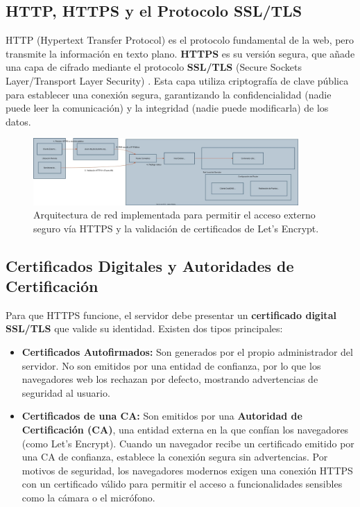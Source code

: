 \subsection{HTTP, HTTPS y el Protocolo SSL/TLS}
HTTP (Hypertext Transfer Protocol) es el protocolo fundamental de la web, pero transmite la información en texto plano. \textbf{HTTPS} es su versión segura, que añade una capa de cifrado mediante el protocolo \textbf{SSL/TLS} (Secure Sockets Layer/Transport Layer Security) \cite{rescorla2001ssl}. Esta capa utiliza criptografía de clave pública para establecer una conexión segura, garantizando la confidencialidad (nadie puede leer la comunicación) y la integridad (nadie puede modificarla) de los datos.

\begin{figure}[H]
    \centering
    \includegraphics[width=0.9\textwidth]{img/ArquitecturadeRedparaelDesplieguedeJitsi.jpg}
    \caption{Arquitectura de red implementada para permitir el acceso externo seguro vía HTTPS y la validación de certificados de Let's Encrypt.}
    \label{fig:arquitectura_red_letsencrypt}
\end{figure}

\subsection{Certificados Digitales y Autoridades de Certificación}
Para que HTTPS funcione, el servidor debe presentar un \textbf{certificado digital SSL/TLS} que valide su identidad. Existen dos tipos principales:
\begin{itemize}
    \item \textbf{Certificados Autofirmados:} Son generados por el propio administrador del servidor. No son emitidos por una entidad de confianza, por lo que los navegadores web los rechazan por defecto, mostrando advertencias de seguridad al usuario.
    \item \textbf{Certificados de una CA:} Son emitidos por una \textbf{Autoridad de Certificación (CA)}, una entidad externa en la que confían los navegadores (como Let's Encrypt). Cuando un navegador recibe un certificado emitido por una CA de confianza, establece la conexión segura sin advertencias. Por motivos de seguridad, los navegadores modernos exigen una conexión HTTPS con un certificado válido para permitir el acceso a funcionalidades sensibles como la cámara o el micrófono.
\end{itemize}

